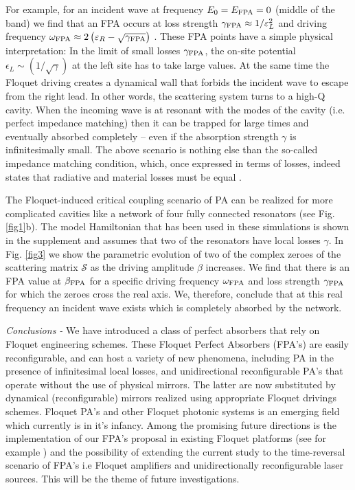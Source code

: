 \documentclass[aps,prl,twocolumn,showpacs,groupedaddress,amsmath,amssymb]{revtex4}
\begin{document}
For example, for an incident wave at frequency $E_0=E_{\rm FPA}=0$ (middle of the band) we find that an FPA occurs at loss strength 
$\gamma_{\rm FPA}\approx 1/\varepsilon_{L}^2$ and driving frequency $\omega_{\rm FPA}\approx 2\left(\varepsilon_{R}-\sqrt{
\gamma_{\rm FPA}}\right)$ \cite{note1}. These FPA points have a simple physical interpretation: In the limit of small losses $\gamma_{
\rm FPA}$, the on-site potential $\epsilon_L\sim (1/\sqrt{\gamma})$ at the left site has to take large values. At the same time the Floquet 
driving creates a dynamical wall that forbids the incident wave to escape from the right 
lead. In other words, the scattering system turns to a high-Q cavity. When the incoming wave is at resonant with the modes of the cavity 
(i.e. perfect impedance matching) then it can be trapped for large times and eventually absorbed completely -- even if the absorption 
strength $\gamma$ is infinitesimally small. The above scenario is nothing else than the so-called impedance matching condition, which, 
once expressed in terms of losses, indeed states that radiative and material losses must be equal \cite{H84}.

The Floquet-induced critical coupling scenario of PA can be realized for more complicated cavities like a network of four fully connected 
resonators (see Fig. \ref{fig1}b). The model Hamiltonian that has been used in these simulations is shown in the supplement and assumes
that two of the resonators have local losses $\gamma$. In Fig. \ref{fig3} we show the parametric evolution of two of the complex zeroes 
of the scattering matrix $\mathcal{S}$ as the driving amplitude $\beta$ increases. We find that there is an FPA value at $\beta_{\rm FPA}$ 
for a specific driving frequency $\omega_{\rm FPA}$ and loss strength $\gamma_{\rm FPA}$ for which the zeroes cross the real axis. We, 
therefore, conclude that at this real frequency an incident wave exists which is completely absorbed by the network.

{\it Conclusions -} We have introduced a class of perfect absorbers that rely on Floquet engineering schemes. These Floquet Perfect 
Absorbers (FPA's) are easily reconfigurable, and can host a variety of new phenomena, including PA in the presence of infinitesimal 
local losses, and unidirectional reconfigurable PA's that operate without the use of physical mirrors. The latter are now substituted by 
dynamical (reconfigurable) mirrors realized using appropriate Floquet drivings schemes. Floquet PA's and other Floquet photonic systems 
is an emerging field which currently is in it's infancy. Among the promising future directions is the implementation of our FPA's proposal 
in existing Floquet platforms (see for example \cite{CLEK17}) and the possibility of extending the current study to the time-reversal 
scenario of FPA's i.e Floquet amplifiers and unidirectionally reconfigurable laser sources. This will be the theme of future investigations.
\end{document}
